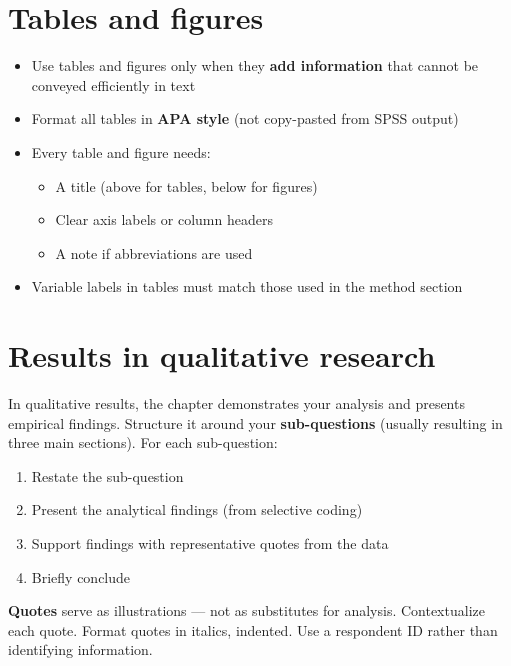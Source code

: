 \documentclass[
  11pt,
  a4paper,
]{scrbook}
\providecommand{\tightlist}{%
  \setlength{\itemsep}{0pt}\setlength{\parskip}{0pt}}\usepackage{longtable,booktabs,array}
\begin{document}
\section{Tables and figures}\label{tables-and-figures}

\begin{itemize}
\tightlist
\item
  Use tables and figures only when they \textbf{add information} that
  cannot be conveyed efficiently in text
\item
  Format all tables in \textbf{APA style} (not copy-pasted from SPSS
  output)
\item
  Every table and figure needs:

  \begin{itemize}
  \tightlist
  \item
    A title (above for tables, below for figures)
  \item
    Clear axis labels or column headers
  \item
    A note if abbreviations are used
  \end{itemize}
\item
  Variable labels in tables must match those used in the method section
\end{itemize}

\section{Results in qualitative
research}\label{results-in-qualitative-research}

In qualitative results, the chapter demonstrates your analysis and
presents empirical findings. Structure it around your
\textbf{sub-questions} (usually resulting in three main sections). For
each sub-question:

\begin{enumerate}
\def\labelenumi{\arabic{enumi}.}
\tightlist
\item
  Restate the sub-question
\item
  Present the analytical findings (from selective coding)
\item
  Support findings with representative quotes from the data
\item
  Briefly conclude
\end{enumerate}

\textbf{Quotes} serve as illustrations --- not as substitutes for
analysis. Contextualize each quote. Format quotes in italics, indented.
Use a respondent ID rather than identifying information.
\end{document}
